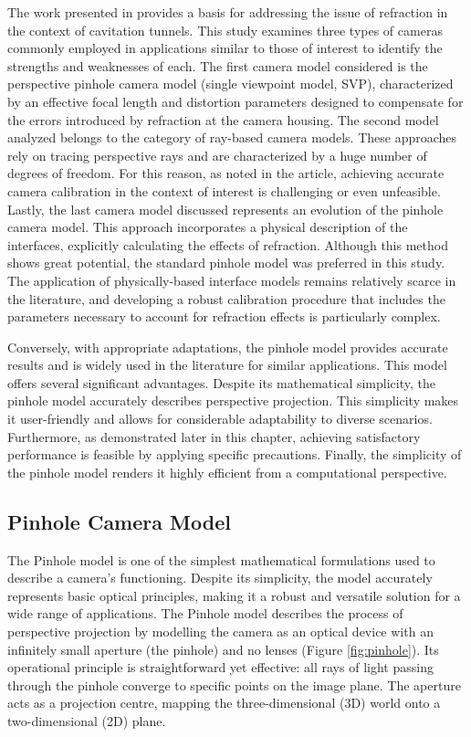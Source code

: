 The work presented in \cite{Sedlazeck2012} provides a basis for addressing the issue of refraction in the context of cavitation tunnels. This study examines three types of cameras commonly employed in applications similar to those of interest to identify the strengths and weaknesses of each.
The first camera model considered is the perspective pinhole camera model (single viewpoint model, SVP), characterized by an effective focal length and distortion parameters designed to compensate for the errors introduced by refraction at the camera housing. The second model analyzed belongs to the category of ray-based camera models. These approaches rely on tracing perspective rays and are characterized by a huge number of degrees of freedom. For this reason, as noted in the article, achieving accurate camera calibration in the context of interest is challenging or even unfeasible.
Lastly, the last camera model discussed represents an evolution of the pinhole camera model. This approach incorporates a physical description of the interfaces, explicitly calculating the effects of refraction. Although this method shows great potential, the standard pinhole model was preferred in this study. The application of physically-based interface models remains relatively scarce in the literature, and developing a robust calibration procedure that includes the parameters necessary to account for refraction effects is particularly complex.

Conversely, with appropriate adaptations, the pinhole model provides accurate results and is widely used in the literature for similar applications. This model offers several significant advantages. Despite its mathematical simplicity, the pinhole model accurately describes perspective projection. This simplicity makes it user-friendly and allows for considerable adaptability to diverse scenarios. Furthermore, as demonstrated later in this chapter, achieving satisfactory performance is feasible by applying specific precautions. Finally, the simplicity of the pinhole model renders it highly efficient from a computational perspective.

\subsection{Pinhole Camera Model}

The Pinhole model is one of the simplest mathematical formulations used to describe a camera's functioning. Despite its simplicity, the model accurately represents basic optical principles, making it a robust and versatile solution for a wide range of applications.
The Pinhole model describes the process of perspective projection by modelling the camera as an optical device with an infinitely small aperture (the pinhole) and no lenses (Figure \ref{fig:pinhole}). Its operational principle is straightforward yet effective: all rays of light passing through the pinhole converge to specific points on the image plane. The aperture acts as a projection centre, mapping the three-dimensional (3D) world onto a two-dimensional (2D) plane.

